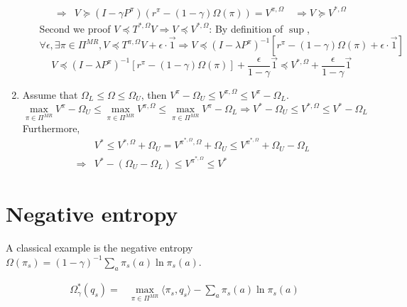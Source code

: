 \documentclass[a4paper]{article}
\begin{document}
\begin{enumerate}
\begin{itemize}
\begin{align*}
                    \Rightarrow& V \succeq {(I - \gamma P^{\pi})}(r^{\pi} - (1-\gamma)\Omega(\pi)) = V^{\pi,\Omega}
                    \quad \Rightarrow V \succeq V^{*, \Omega}
                \end{align*}
                Second we proof $ V \preceq T^{*,\Omega} V \Rightarrow V \preceq V^{*,\Omega}$:
                By definition of $ \sup $,
                \[
                    \forall \epsilon, \exists \pi \in \Pi^{MR}, V \preceq T^{\pi, \Omega}V + \epsilon \cdot \vec{1}
                    \Rightarrow V \preceq {(I - \lambda P^{\pi})}^{-1} [r^{\pi} - (1-\gamma)\Omega(\pi) + \epsilon \cdot \vec{1}] 
                \]
                \[
                    V \preceq {(I - \lambda P^{\pi})}^{-1} [r^{\pi} - (1-\gamma)\Omega(\pi)] + \frac{\epsilon}{1 - \gamma} \vec{1} \preceq V^{*, \Omega} + \frac{\epsilon}{1 - \gamma} \vec{1}
                \]
        \end{itemize}
    \item Assume that $ \Omega_L \le \Omega \le \Omega_U $, then $ V^{\pi} - \Omega_U \le V^{\pi, \Omega} \le V^{\pi} - \Omega_L $.
        \[
             \max_{\pi \in \Pi^{MR}} V^{\pi} - \Omega_U \le \max_{\pi \in \Pi^{MR}} V^{\pi, \Omega} \le \max_{\pi \in \Pi^{MR}} V^{\pi} - \Omega_L \Rightarrow V^{*} - \Omega_U \le V^{*, \Omega} \le V^{*} - \Omega_L
        \]
        Furthermore,
        \begin{align*}
            &V^{*} \le V^{*, \Omega} + \Omega_U = V^{\pi^{*, \Omega}, \Omega} + \Omega_U \le V^{\pi^{*,\Omega}} + \Omega_U - \Omega_L \\
            \Rightarrow& V^* - \left( \Omega_U - \Omega_L \right) \le V^{\pi^{*, \Omega}} \le V^{*}
        \end{align*}
\end{enumerate}

\section{Negative entropy}%

A classical example is the negative entropy $ \Omega(\pi_s) = {(1 - \gamma)}^{-1}\sum^{}_{a} \pi_s(a) \ln \pi_s(a) $.

\begin{align*}
    \Omega^{*}_{\gamma}(q_s) =& \max_{\pi \in \Pi^{MR}} \langle \pi_s, q_s \rangle - \sum^{}_{a} \pi_s(a) \ln \pi_s(a)\\
\end{align*}
\end{document}
